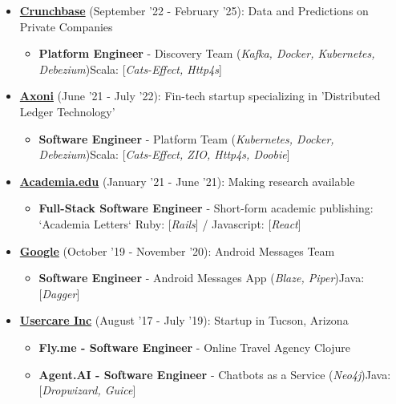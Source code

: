 \documentclass{article}
\begin{document}
\begin{itemize}
\item \href{https://crunchbase.com}{\textbf{Crunchbase}} {(September '22 - February '25)}: Data and Predictions on Private Companies 
\begin{itemize}
\item \textbf{Platform Engineer} - Discovery Team (\textit{Kafka, Docker, Kubernetes, Debezium})\newline Scala: [\textit{Cats-Effect, Http4s}]
\end{itemize}
\item \href{https://axoni.com}{\textbf{Axoni}} {(June '21 - July '22)}: Fin-tech startup specializing in 'Distributed Ledger Technology' 
\begin{itemize}
\item \textbf{Software Engineer} - Platform Team (\textit{Kubernetes, Docker, Debezium})\newline Scala: [\textit{Cats-Effect, ZIO, Http4s, Doobie}]
\end{itemize}
\item \href{https://academia.edu}{\textbf{Academia.edu}} {(January '21 - June '21)}: Making research available 
\begin{itemize}
\item \textbf{Full-Stack Software Engineer} - Short-form academic publishing: `Academia Letters` \newline Ruby: [\textit{Rails}] / Javascript: [\textit{React}]
\end{itemize}
\item \href{https://google.com}{\textbf{Google}} {(October '19 - November '20)}: Android Messages Team 
\begin{itemize}
\item \textbf{Software Engineer} - Android Messages App (\textit{Blaze, Piper})\newline Java: [\textit{Dagger}]
\end{itemize}
\item \href{https://www.crunchbase.com/organization/usercare}{\textbf{Usercare Inc}} {(August '17 - July '19)}: Startup in Tucson, Arizona 
\begin{itemize}
\item \textbf{Fly.me - Software Engineer} - Online Travel Agency \newline Clojure
\item \textbf{Agent.AI - Software Engineer} - Chatbots as a Service (\textit{Neo4j})\newline Java: [\textit{Dropwizard, Guice}]

\end{itemize}
\end{itemize}
\end{document}
